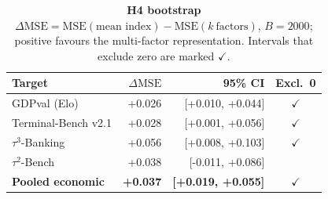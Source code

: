 \begin{table}[!tb]
\centering
\caption[H4 bootstrap predictive-validity test]{\textbf{H4 bootstrap} $\Delta\mathrm{MSE} = \mathrm{MSE}(\text{mean index}) -
\mathrm{MSE}(k\ \text{factors})$, $B=2000$; positive favours the multi-factor representation. Intervals
that exclude zero are marked $\checkmark$.}
\label{tab:h4}
\small
\begin{tabular}{@{}lrrc@{}}
\toprule
Target & $\Delta\mathrm{MSE}$ & 95\% CI & Excl.\ 0 \\
\midrule
GDPval (Elo) & +0.026 & [+0.010, +0.044] & $\checkmark$ \\
Terminal-Bench v2.1 & +0.028 & [+0.001, +0.056] & $\checkmark$ \\
$\tau^3$-Banking & +0.056 & [+0.008, +0.103] & $\checkmark$ \\
$\tau^2$-Bench & +0.038 & [-0.011, +0.086] &  \\
\textbf{Pooled economic} & \textbf{+0.037} & \textbf{[+0.019, +0.055]} & $\checkmark$ \\
\bottomrule
\end{tabular}
\end{table}